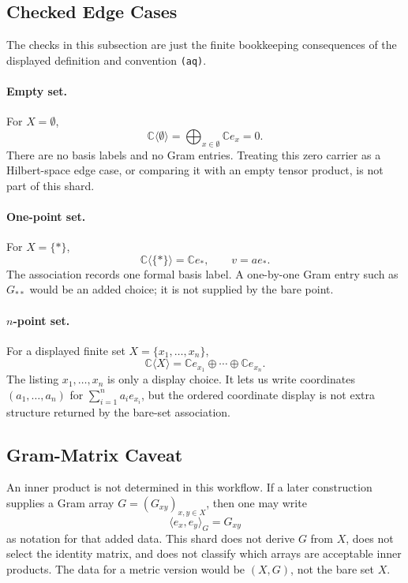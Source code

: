 \subsection{Checked Edge Cases}

The checks in this subsection are just the finite bookkeeping consequences of
the displayed definition and convention \texttt{(aq)}.

\paragraph{Empty set.}
For \(X=\emptyset\),
\[
  \mathbb C\langle\emptyset\rangle
  =
  \bigoplus_{x\in\emptyset}\mathbb C e_x
  =
  0.
\]
There are no basis labels and no Gram entries.  Treating this zero carrier as
a Hilbert-space edge case, or comparing it with an empty tensor product, is not
part of this shard.

\paragraph{One-point set.}
For \(X=\{\ast\}\),
\[
  \mathbb C\langle\{\ast\}\rangle=\mathbb C e_\ast,
  \qquad
  v=a e_\ast .
\]
The association records one formal basis label.  A one-by-one Gram entry such
as \(G_{\ast\ast}\) would be an added choice; it is not supplied by the bare
point.

\paragraph{\(n\)-point set.}
For a displayed finite set \(X=\{x_1,\ldots,x_n\}\),
\[
  \mathbb C\langle X\rangle
  =
  \mathbb C e_{x_1}\oplus\cdots\oplus \mathbb C e_{x_n}.
\]
The listing \(x_1,\ldots,x_n\) is only a display choice.  It lets us write
coordinates \((a_1,\ldots,a_n)\) for
\(\sum_{i=1}^n a_i e_{x_i}\), but the ordered coordinate display is not extra
structure returned by the bare-set association.

\subsection{Gram-Matrix Caveat}

An inner product is not determined in this workflow.  If a later construction
supplies a Gram array \(G=(G_{xy})_{x,y\in X}\), then one may write
\[
  \langle e_x,e_y\rangle_G=G_{xy}
\]
as notation for that added data.  This shard does not derive \(G\) from \(X\),
does not select the identity matrix, and does not classify which arrays are
acceptable inner products.  The data for a metric version would be
\((X,G)\), not the bare set \(X\).

